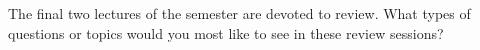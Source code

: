 \documentclass[12pt, leqno]{article}
\begin{document}

The final two lectures of the semester are devoted to review.  What types of
questions or topics would you most like to see in these review sessions?
\end{document}
